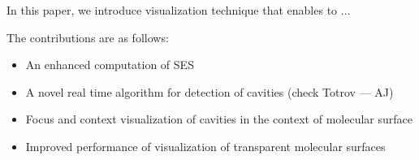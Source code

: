 In this paper, we introduce visualization technique that enables to ...

The contributions are as follows:
\begin{itemize}
  \item An enhanced computation of SES
  \item A novel real time algorithm for detection of cavities (check Totrov --- AJ)
  \item Focus and context visualization of cavities in the context of molecular surface
  \item Improved performance of visualization of transparent molecular surfaces
\end{itemize}